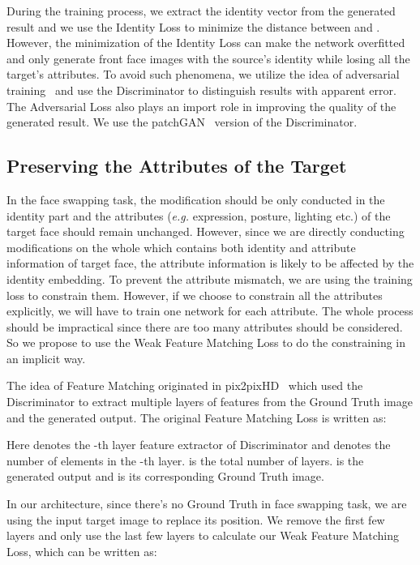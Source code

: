 \documentclass[sigconf]{acmart}
\begin{document}
During the training process, we extract the identity vector  from the generated result  and we use the Identity Loss to minimize the distance between  and . However, the minimization of the Identity Loss can make the network overfitted and only generate front face images with the source's identity while losing all the target's attributes. To avoid such phenomena, we utilize the idea of adversarial training~\cite{DBLP:GAN,DBLP:SPADE,DBLP:FUNIT,DBLP:styleGAN} and use the Discriminator to distinguish results with apparent error. The Adversarial Loss also plays an import role in improving the quality of the generated result. We use the patchGAN~\cite{DBLP:pix2pix} version of the Discriminator.

\subsection{Preserving the Attributes of the Target}
In the face swapping task, the modification should be only conducted in the identity part and the attributes (\emph{e.g.} expression, posture, lighting etc.) of the target face should remain unchanged. However, since we are directly conducting modifications on the whole  which contains both identity and attribute information of target face, the attribute information is likely to be affected by the identity embedding. To prevent the attribute mismatch, we are using the training loss to constrain them. However, if we choose to constrain all the attributes explicitly, we will have to train one network for each attribute. The whole process should be impractical since there are too many attributes should be considered. So we propose to use the Weak Feature Matching Loss to do the constraining in an implicit way.

The idea of Feature Matching originated in pix2pixHD~\cite{DBLP:pix2pixHD} which used the Discriminator to extract multiple layers of features from the Ground Truth image and the generated output. The original Feature Matching Loss is written as:

Here  denotes the -th layer feature extractor of Discriminator  and  denotes the number of elements in the -th layer.  is the total number of layers.  is the generated output and  is its corresponding Ground Truth image.

In our architecture, since there's no Ground Truth in face swapping task, we are using the input target image  to replace its position. We remove the first few layers and only use the last few layers to calculate our Weak Feature Matching Loss, which can be written as:
\end{document}
